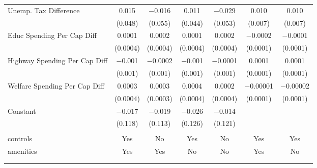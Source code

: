 \begin{table}[!htbp]
\begin{tabular}{@{\extracolsep{5pt}}lcccccc}
  Unemp. Tax Difference & 0.015 & $-$0.016 & 0.011 & $-$0.029 & 0.010 & 0.010 \\ 
  & (0.048) & (0.055) & (0.044) & (0.053) & (0.007) & (0.007) \\ 
  Educ Spending Per Cap Diff & 0.0001 & 0.0002 & 0.0001 & 0.0002 & $-$0.0002 & $-$0.0001 \\ 
  & (0.0004) & (0.0004) & (0.0004) & (0.0004) & (0.0001) & (0.0001) \\ 
  Highway Spending Per Cap Diff & $-$0.001 & $-$0.0002 & $-$0.001 & $-$0.0001 & 0.0001 & 0.0001 \\ 
  & (0.001) & (0.001) & (0.001) & (0.001) & (0.0001) & (0.0001) \\ 
  Welfare Spending Per Cap Diff & 0.0003 & 0.0003 & 0.0004 & 0.0002 & $-$0.00001 & $-$0.00002 \\ 
  & (0.0004) & (0.0003) & (0.0004) & (0.0004) & (0.0001) & (0.0001) \\ 
  Constant & $-$0.017 & $-$0.019 & $-$0.026 & $-$0.014 &  &  \\ 
  & (0.118) & (0.113) & (0.126) & (0.121) &  &  \\ 
 \hline \\[-1.8ex] 
controls & Yes & No & Yes & No & Yes & Yes \\ 
amenities & Yes & Yes & No & No & Yes & No \\ 
\hline \\[-1.8ex] 
\hline 
\hline \\[-1.8ex] 
\end{tabular} 
\end{table} 
